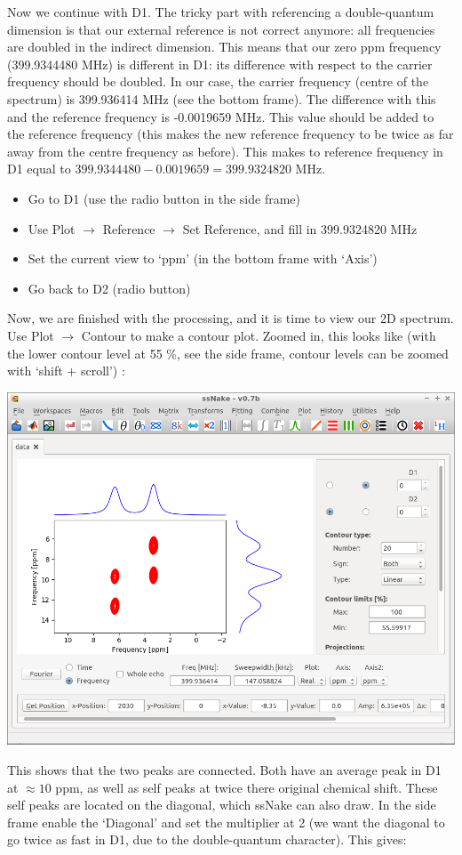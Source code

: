 \documentclass[11pt,a4paper]{article}
\begin{document}
Now we continue with D1. The tricky part with referencing a double-quantum dimension is that our
external reference is not correct anymore: all frequencies are doubled in the indirect dimension.
This means that our zero ppm frequency (399.9344480 MHz) is different in D1: its difference with
respect to the carrier frequency should be doubled. In our case, the carrier frequency (centre of
the spectrum) is 399.936414 MHz (see the bottom frame). The difference with this and the reference
frequency is -0.0019659 MHz. This value should be added to the reference frequency (this makes the
new reference frequency to be twice as far away from the centre frequency as before). This makes to
reference frequency in D1 equal to  $399.9344480 -0.0019659 = 399.9324820$ MHz.

\begin{itemize}
  \item Go to D1 (use the radio button in the side frame)
  \item Use Plot $\longrightarrow$ Reference $\longrightarrow$ Set Reference, and fill in
399.9324820 MHz
	 	\item Set the current view to `ppm' (in the bottom frame with `Axis')
	\item Go back to D2 (radio button)
\end{itemize}
Now, we are finished with the processing, and it is time to view our 2D spectrum. Use Plot
$\longrightarrow$ Contour to make a contour plot. Zoomed in, this looks like (with the lower contour
level at 55 \%, see the side frame, contour levels can be zoomed with `shift + scroll') :

\begin{center}
\includegraphics[width=0.7\linewidth]{Figs/Fig7.png}
\end{center}
This shows that the two peaks are connected. Both have an average peak in D1 at $\approx 10$ ppm, as
well as self peaks at twice there original chemical shift. These self peaks are located on the
diagonal, which ssNake can also draw. In the side frame enable the `Diagonal' and set the
multiplier at 2 (we want the diagonal to go twice as fast in D1, due to the double-quantum
character). This gives:
\end{document}
